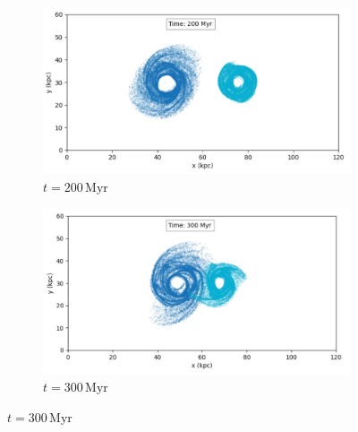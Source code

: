 \begin{figure}[H]
    \centering
    \begin{subfigure}[b]{0.8\textwidth}
        \centering
        \includegraphics[width=\textwidth]{chapters/results/img/p3m-collision/200myr.png}
        \caption{$t=200\,\text{Myr}$}
        \label{fig:collision-p3m-sub1}
    \end{subfigure}

    \vspace{0.2cm}

    \begin{subfigure}[b]{0.8\textwidth}
        \centering
        \includegraphics[width=\textwidth]{chapters/results/img/p3m-collision/300myr.png}
        \caption{$t=300\,\text{Myr}$}
        \label{fig:collision-p3m-sub2}
    \end{subfigure}

    \vspace{0.2cm}


\end{figure}
